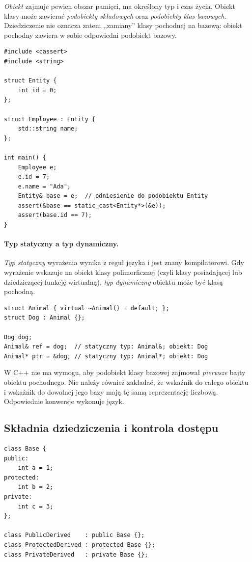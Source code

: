 \emph{Obiekt} zajmuje pewien obszar pamięci, ma określony typ i czas życia.
Obiekt klasy może zawierać \emph{podobiekty składowych} oraz
\emph{podobiekty klas bazowych}. Dziedziczenie nie oznacza zatem
,,zamiany'' klasy pochodnej na bazową: obiekt pochodny zawiera w sobie
odpowiedni podobiekt bazowy.

\begin{lstlisting}[caption={Klasa pochodna zawiera podobiekt bazowy (C++11); kompletny program.}]
#include <cassert>
#include <string>

struct Entity {
    int id = 0;
};

struct Employee : Entity {
    std::string name;
};

int main() {
    Employee e;
    e.id = 7;
    e.name = "Ada";
    Entity& base = e;  // odniesienie do podobiektu Entity
    assert(&base == static_cast<Entity*>(&e));
    assert(base.id == 7);
}
\end{lstlisting}

\paragraph{Typ statyczny a typ dynamiczny.}
\emph{Typ statyczny} wyrażenia wynika z reguł języka i jest znany
kompilatorowi. Gdy wyrażenie wskazuje na obiekt klasy polimorficznej
(czyli klasy posiadającej lub dziedziczącej funkcję wirtualną),
\emph{typ dynamiczny} obiektu może być klasą pochodną.

\begin{lstlisting}[caption={Statyczny i dynamiczny typ obiektu; fragment.}]
struct Animal { virtual ~Animal() = default; };
struct Dog : Animal {};

Dog dog;
Animal& ref = dog;  // statyczny typ: Animal&; obiekt: Dog
Animal* ptr = &dog; // statyczny typ: Animal*; obiekt: Dog
\end{lstlisting}

\noindent W C++ nie ma wymogu, aby podobiekt klasy bazowej zajmował
\emph{pierwsze} bajty obiektu pochodnego. Nie należy również zakładać,
że wskaźnik do całego obiektu i wskaźnik do dowolnej jego bazy mają
tę samą reprezentację liczbową. Odpowiednie konwersje wykonuje język.

\subsection{Składnia dziedziczenia i kontrola dostępu}

\begin{lstlisting}[caption={Dziedziczenie publiczne, chronione i prywatne; fragment.}]
class Base {
public:
    int a = 1;
protected:
    int b = 2;
private:
    int c = 3;
};

class PublicDerived    : public Base {};
class ProtectedDerived : protected Base {};
class PrivateDerived   : private Base {};
\end{lstlisting}

